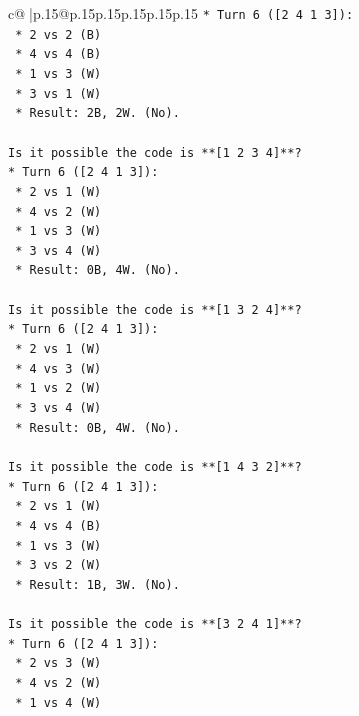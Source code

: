 \documentclass{article}
\begin{document}
{\begin{supertabular}{c@{$\;$}|p{.15\linewidth}@{}p{.15\linewidth}p{.15\linewidth}p{.15\linewidth}p{.15\linewidth}p{.15\linewidth}}
{{{\texttt{*   Turn 6 ({[}2 4 1 3{]}):} \\
\texttt{    *   2 vs 2 (B)} \\
\texttt{    *   4 vs 4 (B)} \\
\texttt{    *   1 vs 3 (W)} \\
\texttt{    *   3 vs 1 (W)} \\
\texttt{    *   Result: 2B, 2W. (No).} \\
\\ 
\texttt{Is it possible the code is **{[}1 2 3 4{]}**?} \\
\texttt{*   Turn 6 ({[}2 4 1 3{]}):} \\
\texttt{    *   2 vs 1 (W)} \\
\texttt{    *   4 vs 2 (W)} \\
\texttt{    *   1 vs 3 (W)} \\
\texttt{    *   3 vs 4 (W)} \\
\texttt{    *   Result: 0B, 4W. (No).} \\
\\ 
\texttt{Is it possible the code is **{[}1 3 2 4{]}**?} \\
\texttt{*   Turn 6 ({[}2 4 1 3{]}):} \\
\texttt{    *   2 vs 1 (W)} \\
\texttt{    *   4 vs 3 (W)} \\
\texttt{    *   1 vs 2 (W)} \\
\texttt{    *   3 vs 4 (W)} \\
\texttt{    *   Result: 0B, 4W. (No).} \\
\\ 
\texttt{Is it possible the code is **{[}1 4 3 2{]}**?} \\
\texttt{*   Turn 6 ({[}2 4 1 3{]}):} \\
\texttt{    *   2 vs 1 (W)} \\
\texttt{    *   4 vs 4 (B)} \\
\texttt{    *   1 vs 3 (W)} \\
\texttt{    *   3 vs 2 (W)} \\
\texttt{    *   Result: 1B, 3W. (No).} \\
\\ 
\texttt{Is it possible the code is **{[}3 2 4 1{]}**?} \\
\texttt{*   Turn 6 ({[}2 4 1 3{]}):} \\
\texttt{    *   2 vs 3 (W)} \\
\texttt{    *   4 vs 2 (W)} \\
\texttt{    *   1 vs 4 (W)} \\
}}}
\end{supertabular}}
\end{document}
